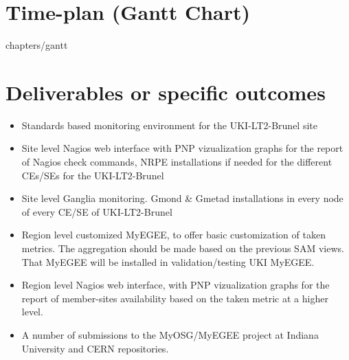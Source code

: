 \section[Time plan]{Time-plan (Gantt Chart)}

 {chapters/gantt}
\pagebreak
\section[Deliverables]{Deliverables or specific outcomes}

\begin{itemize}
  \item Standards based monitoring environment for the UKI-LT2-Brunel site
  \item Site level Nagios web interface with PNP vizualization graphs for the
  report of Nagios check commands, NRPE installations if needed for the
  different CEs/SEs for the UKI-LT2-Brunel
  \item Site level Ganglia monitoring. Gmond \& Gmetad installations in every
  node of every CE/SE of UKI-LT2-Brunel
  \item Region level customized MyEGEE, to offer basic customization of taken
  metrics. The aggregation should be made based on the previous SAM views. That
  MyEGEE will be installed in validation/testing UKI MyEGEE.
  \item Region level Nagios web interface, with PNP vizualization graphs for the
  report of member-sites availability based on the taken metric at a higher
  level.
  \item A number of submissions to the MyOSG/MyEGEE project at Indiana
  University and CERN repositories.
\end{itemize}